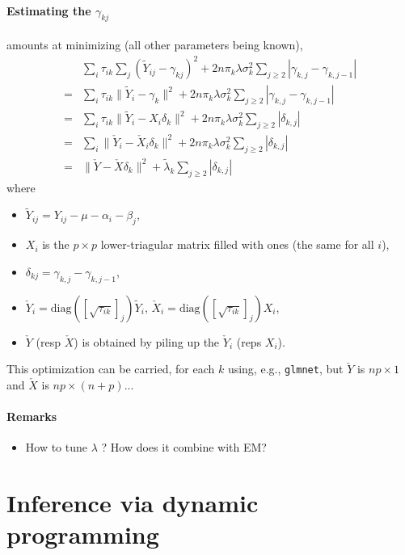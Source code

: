 \documentclass[a4paper, 11pt]{article}
\newcommand{\lambdat}{\widetilde{\lambda}}
\newcommand{\Xc}{\check{X}}
\newcommand{\Yc}{\check{Y}}
\newcommand{\Yt}{\widetilde{Y}}
\begin{document}
\paragraph{Estimating the $\gamma_{kj}$} amounts at minimizing (all other parameters being known),
\begin{align*}
 & \sum_i \tau_{ik} \sum_j (\Yt_{ij} -\gamma_{kj})^2  + 2 n \pi_k \lambda \sigma^2_k \sum_{j\geq 2} |\gamma_{k,j} - \gamma_{k, j-1}| \\
 = & \sum_i \tau_{ik} \|\Yt_i -\gamma_k\|^2  + 2 n \pi_k \lambda \sigma^2_k \sum_{j\geq 2} |\gamma_{k,j} - \gamma_{k, j-1}| \\
 = & \sum_i \tau_{ik} \|\Yt_i - X_i \delta_k\|^2  + 2 n \pi_k \lambda \sigma^2_k \sum_{j\geq 2} |\delta_{k,j}| \\
 = & \sum_i \|\Yc_i - \Xc_i \delta_k\|^2  + 2 n \pi_k \lambda \sigma^2_k \sum_{j\geq 2} |\delta_{k,j}| \\ 
 = & \|\Yc - \Xc \delta_k\|^2  + \lambdat_k \sum_{j\geq 2} |\delta_{k,j}| 
\end{align*}
where 
\begin{itemize}
 \item $\Yt_{ij} = Y_{ij} - \mu - \alpha_i - \beta_j$,
 \item $X_i$ is the $p \times p$ lower-triagular matrix filled with ones (the same for all $i$), 
 \item $\delta_{kj} = \gamma_{k,j} - \gamma_{k, j-1}$, 
 \item $\Yc_i = \text{diag}([\sqrt{\tau_{ik}}]_j) \Yt_i$, $\Xc_i = \text{diag}([\sqrt{\tau_{ik}}]_j) X_i$,
 \item $\Yc$ (resp $\Xc$) is obtained by piling up the $\Yc_i$ (reps $X_i$).
\end{itemize}
This optimization can be carried, for each $k$ using, e.g., {\tt glmnet}, but $\Yc$ is $np \times 1$ and $\Xc$ is $np \times (n+p)$...

\paragraph{Remarks}
\begin{itemize}
 \item How to tune $\lambda$ ? How does it combine with EM?
\end{itemize}


\section{Inference via dynamic programming}
\end{document}
